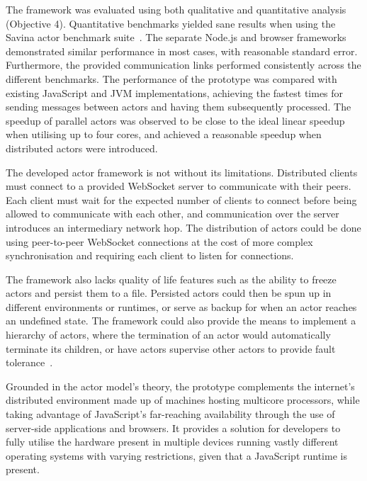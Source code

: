\documentclass[oneside]{um-fict}
\begin{document}
The framework was evaluated using both qualitative and quantitative analysis (Objective 4). Quantitative benchmarks yielded sane results when using the Savina actor benchmark suite~\cite{savina}. The separate Node.js and browser frameworks demonstrated similar performance in most cases, with reasonable standard error. Furthermore, the provided communication links performed consistently across the different benchmarks. The performance of the prototype was compared with existing JavaScript and JVM implementations, achieving the fastest times for sending messages between actors and having them subsequently processed. The speedup of parallel actors was observed to be close to the ideal linear speedup when utilising up to four cores, and achieved a reasonable speedup when distributed actors were introduced. 

The developed actor framework is not without its limitations. Distributed clients must connect to a provided WebSocket server to communicate with their peers. Each client must wait for the expected number of clients to connect before being allowed to communicate with each other, and communication over the server introduces an intermediary network hop. The distribution of actors could be done using peer-to-peer WebSocket connections at the cost of more complex synchronisation and requiring each client to listen for connections.

The framework also lacks quality of life features such as the ability to freeze actors and persist them to a file. Persisted actors could then be spun up in different environments or runtimes, or serve as backup for when an actor reaches an undefined state. The framework could also provide the means to implement a hierarchy of actors, where the termination of an actor would automatically terminate its children, or have actors supervise other actors to provide fault tolerance~\cite{faulttolerance, lebrun}.

Grounded in the actor model's theory, the prototype complements the internet's distributed environment made up of machines hosting multicore processors, while taking advantage of JavaScript's far-reaching availability through the use of server-side applications and browsers. It provides a solution for developers to fully utilise the hardware present in multiple devices running vastly different operating systems with varying restrictions, given that a JavaScript runtime is present.

{%
    \if@openright\cleardoublepage\else\clearpage\fi
    {\scriptsize}
	\printindex
}
\end{document}
